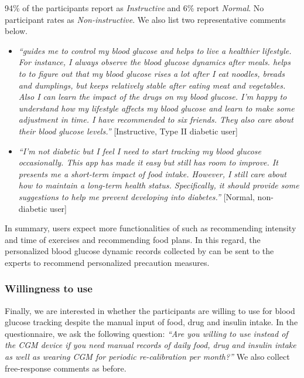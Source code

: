 {94\% of the participants report \sysname as \textit{Instructive} and 6\% report \textit{Normal}.
No participant rates \sysname as \textit{Non-instructive}.
We also list two representative comments below.
\begin{itemize}
  \item
  \textit{``\sysname guides me to control my blood glucose and helps to live a healthier lifestyle.
  For instance, I always observe the blood glucose dynamics after meals.
  \sysname helps to to figure out that my blood glucose rises a lot after I eat noodles, breads and dumplings, but keeps relatively stable after eating meat and vegetables.
  Also I can learn the impact of the drugs on my blood glucose.
  I'm happy to understand how my lifestyle affects my blood glucose and learn to make some adjustment in time.
  I have recommended \sysname to six friends.
  They also care about their blood glucose levels.''}
  [Instructive, Type II diabetic user]
  \item
  \textit{``I'm not diabetic but I feel I need to start tracking my blood glucose occasionally.
  This app has made it easy but still has room to improve.
  It presents me a short-term impact of food intake.
  However, I still care about how to maintain a long-term health status.
  Specifically, it should provide some suggestions to help me prevent developing into diabetes.''}
  [Normal, non-diabetic user]
\end{itemize}
In summary, users expect more functionalities of \sysname such as recommending intensity and time of exercises and recommending food plans.
In this regard, the personalized blood glucose dynamic records collected by \sysname can be sent to the experts to recommend personalized precaution measures.

\subsubsection{Willingness to use \sysname}
Finally, we are interested in whether the participants are willing to use \sysname for blood glucose tracking despite the manual input of food, drug and insulin intake.
In the questionnaire, we ask the following question:
\textit{``Are you willing to use \sysname instead of the CGM device if you need manual records of daily food, drug and insulin intake as well as wearing CGM for periodic re-calibration per month?''}
We also collect free-response comments as before.

}
